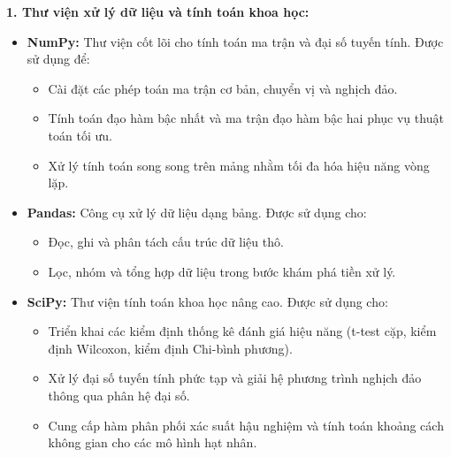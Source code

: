 \textbf{1. Thư viện xử lý dữ liệu và tính toán khoa học:}
\begin{itemize} [labelsep=10pt, leftmargin=2cm]
    \item \textbf{NumPy:} Thư viện cốt lõi cho tính toán ma trận và đại số tuyến tính. Được sử dụng để:
    \begin{itemize}
        \item Cài đặt các phép toán ma trận cơ bản, chuyển vị và nghịch đảo.
        \item Tính toán đạo hàm bậc nhất và ma trận đạo hàm bậc hai phục vụ thuật toán tối ưu.
        \item Xử lý tính toán song song trên mảng nhằm tối đa hóa hiệu năng vòng lặp.
    \end{itemize}
    
    \item \textbf{Pandas:} Công cụ xử lý dữ liệu dạng bảng. Được sử dụng cho:
    \begin{itemize}
        \item Đọc, ghi và phân tách cấu trúc dữ liệu thô.
        \item Lọc, nhóm và tổng hợp dữ liệu trong bước khám phá tiền xử lý.
    \end{itemize}
    
    \item \textbf{SciPy:} Thư viện tính toán khoa học nâng cao. Được sử dụng cho:
    \begin{itemize}
        \item Triển khai các kiểm định thống kê đánh giá hiệu năng (t-test cặp, kiểm định Wilcoxon, kiểm định Chi-bình phương).
        \item Xử lý đại số tuyến tính phức tạp và giải hệ phương trình nghịch đảo thông qua phân hệ đại số.
        \item Cung cấp hàm phân phối xác suất hậu nghiệm và tính toán khoảng cách không gian cho các mô hình hạt nhân.
    \end{itemize}
\end{itemize}

